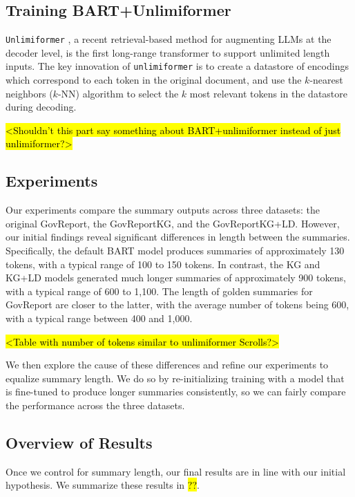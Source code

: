 \documentclass[12pt]{article}
\begin{document}
\subsection*{Training BART+Unlimiformer}
\texttt{Unlimiformer} \cite{bertsch2023unlimiformer}, a recent retrieval-based method for augmenting LLMs at the decoder level, is the first long-range transformer to support unlimited length inputs. The key innovation of \texttt{unlimiformer} is to create a datastore of encodings which correspond to each token in the original document, and use the $k$-nearest neighbors ($k$-NN) algorithm to select the $k$ most relevant tokens in the datastore during decoding.


\hl{<Shouldn't this part say something about BART+unlimiformer instead of just unlimiformer?>}


\subsection*{Experiments}
Our experiments compare the summary outputs across three datasets: the original GovReport, the GovReportKG, and the GovReportKG+LD. However, our initial findings reveal significant differences in length between the summaries. Specifically, the default BART model produces summaries of approximately 130 tokens, with a typical range of 100 to 150 tokens. In contrast, the KG and KG+LD models generated much longer summaries of approximately 900 tokens, with a typical range of 600 to 1,100. The length of golden summaries for GovReport are closer to the latter, with the average number of tokens being 600, with a typical range between 400 and 1,000.


\hl{<Table with number of tokens similar to unlimiformer Scrolls?>}


We then explore the cause of these differences and refine our experiments to equalize summary length. We do so by re-initializing training with a model that is fine-tuned to produce longer summaries consistently, so we can fairly compare the performance across the three datasets.


\subsection*{Overview of Results}
Once we control for summary length, our final results are in line with our initial hypothesis. We summarize these results in \hl{??}.


\end{document}
